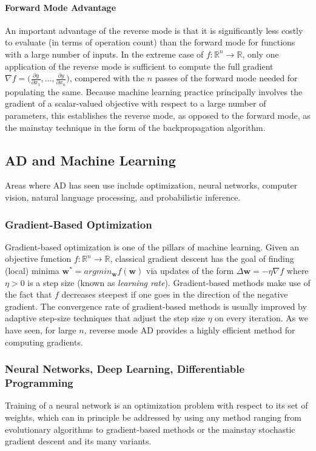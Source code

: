 \paragraph{Forward Mode Advantage}
An important advantage of the reverse mode is that it is significantly less costly to evaluate (in terms of operation count) than the forward mode for functions with a large number of inputs. In the extreme case of $f: \mathbb{R}^n \rightarrow \mathbb{R}$, only one application of the reverse mode is sufficient to compute the full gradient $\nabla f = \bigg( \frac{\partial y}{\partial x_1},..., \frac{\partial y}{\partial x_n}\bigg)$, compered with the $n$ passes of the forward mode needed for populating the same. Because machine learning
practice principally involves the gradient of a scalar-valued objective with respect to a large number of parameters, this establishes the reverse mode, as opposed to the forward mode, as the mainstay technique in the form of the backpropagation algorithm.

\subsection{AD and Machine Learning}
Areas where AD has seen use include optimization, neural networks, computer vision, natural language processing, and probabilistic inference.

\subsubsection{Gradient-Based Optimization}
Gradient-based optimization is one of the pillars of machine learning. Given an objective function $f: \mathbb{R}^n \rightarrow \mathbb{R}$, classical gradient descent has the goal of finding (local) minima $\mathbf{w}^* = argmin_{\mathbf{w}} f(\mathbf{w})$ via updates of the form $\Delta  \mathbf{w} = -\eta \nabla f$ where $\eta >0$ is a step size (known as \emph{learning rate}). Gradient-based methods make use of the fact that $f$ decreases steepest if one goes in the direction of the negative gradient. The convergence rate of gradient-based methods is usually improved by adaptive step-size techniques that adjust the step size $\eta$ on every iteration. As we have seen, for large $n$, reverse mode AD provides a highly efficient method for computing gradients.

\subsubsection{Neural Networks, Deep Learning, Differentiable Programming}
Training of a neural network is an optimization problem with respect to its set of weights, which can in principle be addressed by using any method ranging from evolutionary algorithms to gradient-based methods  or the mainstay stochastic gradient descent and its many variants.

